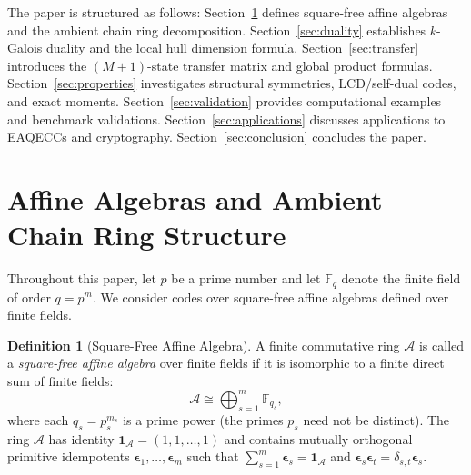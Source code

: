 \documentclass[preprint,12pt]{elsarticle}
\numberwithin{equation}{section}
\theoremstyle{plain}
\theoremstyle{definition}
\newtheorem{definition}[theorem]{Definition}
\theoremstyle{remark}
\begin{document}
The paper is structured as follows: Section~\ref{sec:prelim} defines square-free affine algebras and the ambient chain ring decomposition. Section~\ref{sec:duality} establishes $k$-Galois duality and the local hull dimension formula. Section~\ref{sec:transfer} introduces the $(M+1)$-state transfer matrix and global product formulas. Section~\ref{sec:properties} investigates structural symmetries, LCD/self-dual codes, and exact moments. Section~\ref{sec:validation} provides computational examples and benchmark validations. Section~\ref{sec:applications} discusses applications to EAQECCs and cryptography. Section~\ref{sec:conclusion} concludes the paper.

\section{Affine Algebras and Ambient Chain Ring Structure}\label{sec:prelim}

Throughout this paper, let $p$ be a prime number and let $\mathbb{F}_q$ denote the finite field of order $q = p^m$. We consider codes over square-free affine algebras defined over finite fields.

\begin{definition}[Square-Free Affine Algebra]
A finite commutative ring $\mathcal{A}$ is called a \emph{square-free affine algebra} over finite fields if it is isomorphic to a finite direct sum of finite fields:
\begin{equation}
    \mathcal{A} \cong \bigoplus_{s=1}^m \mathbb{F}_{q_s},
\end{equation}
where each $q_s = p_s^{m_s}$ is a prime power (the primes $p_s$ need not be distinct). The ring $\mathcal{A}$ has identity $\mathbf{1}_{\mathcal{A}} = (1, 1, \dots, 1)$ and contains mutually orthogonal primitive idempotents $\boldsymbol{\epsilon}_1, \dots, \boldsymbol{\epsilon}_m$ such that $\sum_{s=1}^m \boldsymbol{\epsilon}_s = \mathbf{1}_{\mathcal{A}}$ and $\boldsymbol{\epsilon}_s \boldsymbol{\epsilon}_t = \delta_{s, t} \boldsymbol{\epsilon}_s$.
\end{definition}
\end{document}
